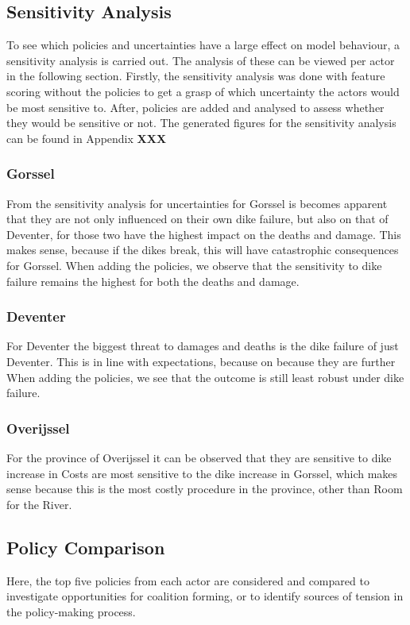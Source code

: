 \subsection{Sensitivity Analysis}

To see which policies and uncertainties have a large effect on model behaviour, a sensitivity analysis is carried out. The analysis of these can be viewed per actor in the following section. Firstly, the sensitivity analysis was done with feature scoring without the policies to get a grasp of which uncertainty the actors would be most sensitive to. After, policies are added and analysed to assess whether they would be sensitive or not. The generated figures for the sensitivity analysis can be found in Appendix \textbf{XXX}

\subsubsection{Gorssel}

From the sensitivity analysis for uncertainties for Gorssel is becomes apparent that they are not only influenced on their own dike failure, but also on that of Deventer, for those two have the highest impact on the deaths and damage. This makes sense, because if the dikes break, this will have catastrophic consequences for Gorssel. When adding the policies, we observe that the sensitivity to dike failure remains the highest for both the deaths and damage. 

\subsubsection{Deventer}

For Deventer the biggest threat to damages and deaths is the dike failure of just Deventer. This is in line with expectations, because on because they are further  When adding the policies, we see that the outcome is still least robust under dike failure. 

\subsubsection{Overijssel}

For the province of Overijssel it can be observed that they are sensitive to dike increase in 
Costs are most sensitive to the dike increase in Gorssel, which makes sense because this is the most costly procedure in the province, other than Room for the River. 

\subsection{Policy Comparison}
Here, the top five policies from each actor are considered and compared to investigate opportunities for coalition forming, or to identify sources of tension in the policy-making process.